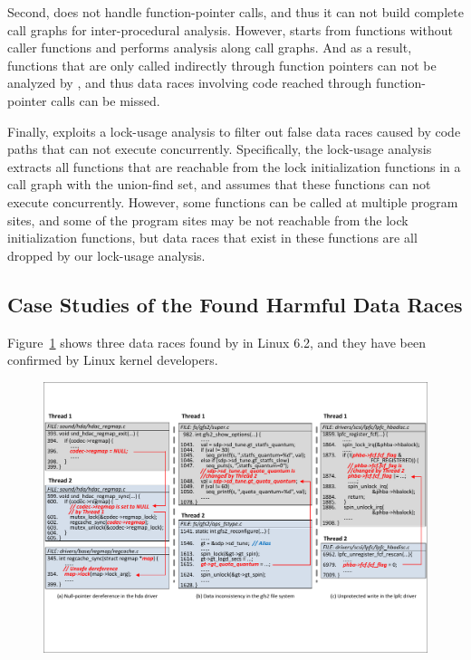 Second, \sys does not handle function-pointer calls, and thus it can not build 
complete call graphs for inter-procedural analysis. However, \sys starts 
from functions without caller functions and performs analysis along call 
graphs. And as a result, functions that are only called indirectly through 
function pointers can not be analyzed by \sys, and thus data races involving 
code reached through function-pointer calls can be missed.

Finally, \sys exploits a lock-usage analysis to filter out false data races 
caused by code paths that can not execute concurrently. Specifically, the 
lock-usage analysis extracts all functions that are reachable from the lock 
initialization functions in a call graph with the union-find set, and assumes 
that these functions can not execute concurrently. However, some functions can 
be called at multiple program sites, and some of the program sites may be not 
reachable from the lock initialization functions, but data races that exist in 
these functions are all dropped by our lock-usage analysis.

\subsection{Case Studies of the Found Harmful Data Races}
\label{subsec_case_study}

Figure~\ref{fig_case_bugs} shows three data races found by \sys in Linux 6.2,
and they have been confirmed by Linux kernel developers.

\begin{figure}[htbp]
	\centering
	\includegraphics[width=1\linewidth]{figures/fig_case_bugs.pdf}
	\label{fig_case_bugs}
\end{figure}

